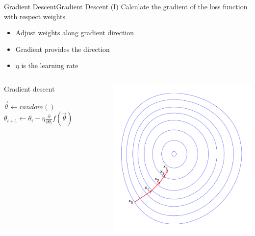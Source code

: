\documentclass[10pt,compress]{beamer} %
\begin{document}
\begin{frame}{Gradient Descent}{Gradient Descent (I)}
	Calculate the gradient of the loss function with respect weights
	\begin{itemize}
		\item Adjust weights along gradient direction
		\item Gradient provides the direction
		\item $\eta$ is the \alert{learning rate}
	\end{itemize}

	\begin{columns}[c]

		\begin{block}{Gradient descent}
		\begin{algorithmic}[1]
		\State $\vec{\theta} \gets random()$
			\State $\theta_{i+1} \gets \theta_i - \eta \frac{\partial}{\partial \theta_i} f(\vec{\theta})$
			\EndFor
		\EndWhile
		\end{algorithmic}
		\end{block}

		\includegraphics[width=\linewidth]{figs/descent.png}
	\end{columns}
\end{frame}
\end{document}
